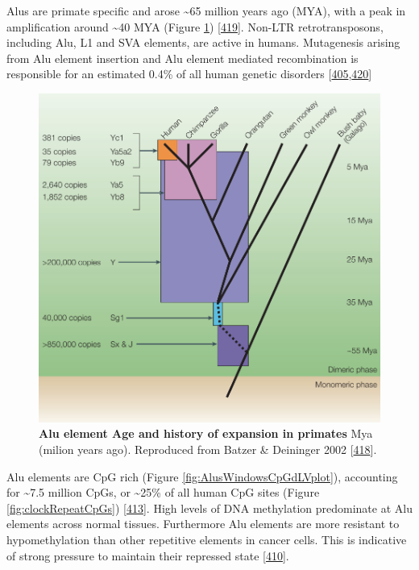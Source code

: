 \documentclass[
]{book}
\begin{document}
Alus are primate specific and arose \textasciitilde65 million years ago (MYA), with a peak in amplification around \textasciitilde40 MYA (Figure \ref{fig:AluAge}) {[}\protect\hyperlink{ref-Ade2013}{419}{]}.
Non-LTR retrotransposons, including Alu, L1 and SVA elements, are active in humans.
Mutagenesis arising from Alu element insertion and Alu element mediated recombination is responsible for an estimated 0.4\% of all human genetic disorders {[}\protect\hyperlink{ref-Kazazian2017}{405},\protect\hyperlink{ref-Belancio2008}{420}{]}

\begin{figure}

{\centering \includegraphics[width=0.9\linewidth]{./figs/Batzer2002_fig2_Alu_age_expansion} 

}

\caption{\textbf{Alu element Age and history of expansion in primates} Mya (milion years ago). Reproduced from Batzer \& Deininger 2002 {[}\protect\hyperlink{ref-Batzer2002}{418}{]}.}\label{fig:AluAge}
\end{figure}



Alu elements are CpG rich (Figure \ref{fig:AlusWindowsCpGdLVplot}), accounting for \textasciitilde7.5 million CpGs, or \textasciitilde25\% of all human CpG sites (Figure \ref{fig:clockRepeatCpGs}) {[}\protect\hyperlink{ref-Deininger2011}{413}{]}.
High levels of DNA methylation predominate at Alu elements across normal tissues.
Furthermore Alu elements are more resistant to hypomethylation than other repetitive elements in cancer cells.
This is indicative of strong pressure to maintain their repressed state {[}\protect\hyperlink{ref-Jorda2017}{410}{]}.
\end{document}
